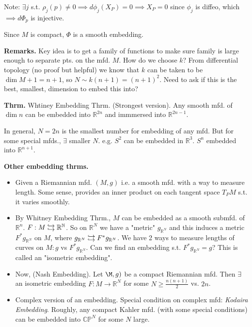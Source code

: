 \documentclass[12pt,letterpaper]{article}
\newcommand\dhookrightarrow{\mathrel{%
  \ensurestackMath{\stackanchor[.1ex]{\hookrightarrow}{\hookrightarrow}}
}}
\begin{document}
Note: $\exists j$ s.t. $\rho_j(p) \neq 0 \implies d\phi_j(X_P) = 0 \implies X_P =0 $ since $\phi_j$ is diffeo, which $\implies d \Phi_p$ is injective.

Since $M$ is compact, $\Phi$ is a smooth embedding. 

\textbf{Remarks.} Key idea is to get a family of functions to make sure family is large enough to separate pts. on the mfd. $M$. How do we choose $k$? From differential topology (no proof but helpful) we know that $k$ can be taken to be $\dim M +1 = n+1$, so $N \sim k(n+1) = (n+1)^2$. Need to ask if this is the best, smallest, dimension to embed this into?

\textbf{Thrm.} Whtiney Embedding Thrm. (Strongest version). Any smooth mfd. of $\dim n$ can be embedded into $\mathbb{R}^{2n}$ and immmersed into $\mathbb{R}^{2n-1}$. 

In general, $N=2n$ is the smallest number for embedding of any mfd. But for some special mfds., $\exists$ smaller $N$. e.g. $S^2$ can be embedded in $\mathbb{R}^3$. $S^n$ embedded into $\mathbb{R}^{n+1}$. 

\textbf{Other embedding thrms.} 
\begin{itemize}
    \item Given a Riemannian mfd. $(M,g)$ i.e. a smooth mfd. with a way to measure length. Some sense, provides an inner product on each tangent space $T_P M$ s.t. it varies smoothly. 
    \item By Whitney Embedding Thrm., $M$ can be embedded as a smooth submfd. of $\mathbb{R}^n$. $F: M \dhookrightarrow \mathbb{R^N}$. So on $\mathbb{R}^N$ we have a "metric" $g_{\mathbb{R}^N}$ and this induces a metric $F^*g_{\mathbb{R}^N}$ on $M$, where $g_{\mathbb{R}^N} \dhookrightarrow F^*g_{\mathbb{R}^N}$. We have 2 ways to measure lengths of curves on $M:g$ vs $F^*g_{\mathbb{R}^N}$. Can we find an embedding s.t. $F^*g_{\mathbb{R}^N} =g$? This is called an "isometric embedding". 
    \item Now,  (Nash Embedding). Let $\M,g)$ be a compact Riemannian mfd. Then $\exists$ an isometric embedding $F: M \rightarrow \mathbb{R}^N$ for some $N \geq \frac{n(n+1)}{2}$ vs. $2n$. 
    \item Complex version of an embedding. Special condition on complex mfd: \textit{Kodaira Embedding}. Roughly, any compact Kahler mfd. (with some special conditions) can be embedded into $\mathbb{C}\mathbb{P}^N$ for some $N$ large.  
\end{itemize}
\end{document}
